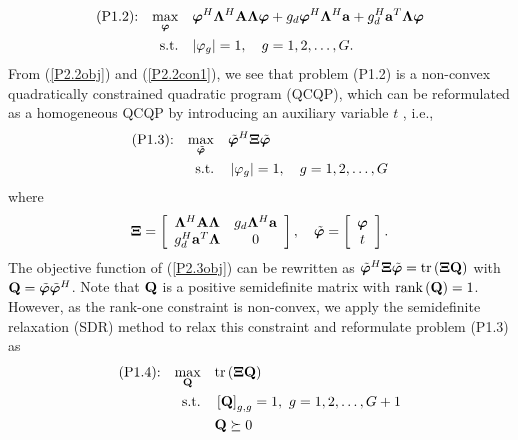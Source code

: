\documentclass[draftclsnofoot,onecolumn,12pt]{IEEEtran}
\begin{document}
\begin{align}
\text{(P1.2):} \quad
 \underset{{\bm \varphi}}{\max}
 & \quad {\bm \varphi}^H {\bf \Lambda}^H {\bf A} {\bf \Lambda} {\bm \varphi} + {{g}}_d {\bm \varphi}^H {\bf \Lambda}^H {\bf a} +{{g}}_d^H {\bf a}^T {\bf \Lambda} {\bm \varphi} \label{P2.2obj}\\
 \text{s.t.}  & \quad  |\varphi_{g}|=1, \quad g=1,2,\ldots,G  . \label{P2.2con1}
\end{align}
From (\ref{P2.2obj}) and (\ref{P2.2con1}), we see that problem (P1.2) is a non-convex quadratically constrained quadratic program (QCQP), which can be reformulated as a homogeneous QCQP by introducing an auxiliary variable $t$ \cite{Anthony2007qop}, i.e., 
\begin{align}
\text{(P1.3):} \quad \underset{\tilde{\bm \varphi}}\max
& \quad {\tilde{\bm \varphi}^H }{\bf \Xi} {\tilde{\bm \varphi}}
\label{P2.3obj}\\
 \text{s.t.} & \quad \left|\varphi_{g}\right|=1,  \quad g=1,2,\ldots,G  \label{P2.3con1}
\end{align}
where 
\begin{align}
{\bf \Xi}=\left[ {\begin{array}{*{20}{c}}
	{{\bf \Lambda}^H{\bf A}{\bf \Lambda}}&{{{g}}_d{\bf \Lambda}^H{\bf a}}\\
	{{g}}_d^H {\bf a}^T {\bf \Lambda}&{0}
	\end{array}} \right], \quad {\tilde{\bm \varphi}}=\left[ {\begin{array}{*{20}{c}}
	{{\bm \varphi}}\\
	{t}
	\end{array}} \right].
\end{align}
The objective function of (\ref{P2.3obj}) can be rewritten as ${\tilde{\bm \varphi}^H }{\bf \Xi}{\tilde{\bm \varphi}}=\text{tr}\left({\bf \Xi} {\bf Q}\right)$ with ${\bf Q}={\tilde{\bm \varphi}}{\tilde{\bm \varphi}^H }$. Note that ${\bf Q}$ is a positive semidefinite matrix with $\text{rank}\left({\bf Q}\right)=1$. However, as the rank-one constraint is non-convex, we apply the semidefinite relaxation (SDR) method to relax this constraint and reformulate problem (P1.3) as
\begin{align}
\text{(P1.4):} \quad
 \underset{\bf Q}{\text{max}}
& \quad \text{tr}\left({\bf \Xi} {\bf Q}\right)
\label{P5obj}\\
 \text{s.t.} & \quad \left[{\bf Q}\right]_{g,g} =1,~  g=1,2,\ldots,G+1\\
& \quad {\bf Q}\succeq 0
\end{align}
\end{document}
